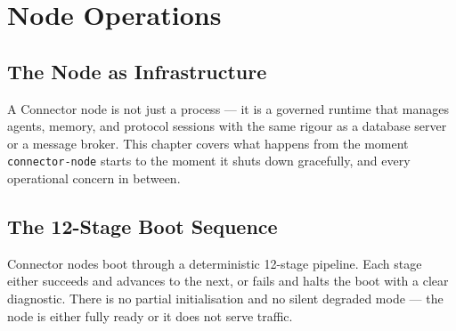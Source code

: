 \chapter{Node Operations}

\section{The Node as Infrastructure}

A Connector node is not just a process — it is a governed runtime that manages
agents, memory, and protocol sessions with the same rigour as a database server
or a message broker. This chapter covers what happens from the moment
\texttt{connector-node} starts to the moment it shuts down gracefully, and
every operational concern in between.

\section{The 12-Stage Boot Sequence}

Connector nodes boot through a deterministic 12-stage pipeline. Each stage
either succeeds and advances to the next, or fails and halts the boot with a
clear diagnostic. There is no partial initialisation and no silent degraded
mode — the node is either fully ready or it does not serve traffic.

